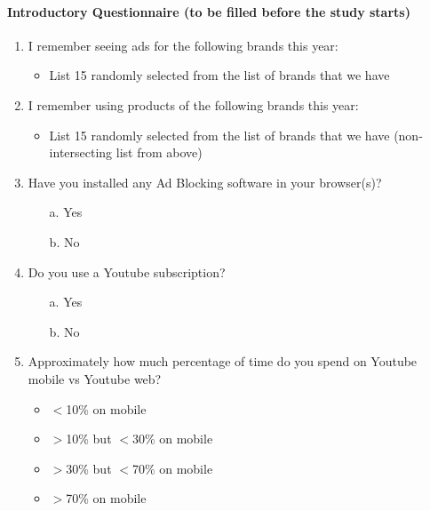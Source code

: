 \paragraph{Introductory Questionnaire (to be filled before the study starts)}

\begin{enumerate}
    \item I remember seeing ads for the following brands this year:
    \begin{itemize}
        \item List 15 randomly selected from the list of brands that we have
    \end{itemize}
    
    \item I remember using products of the following brands this year:
    \begin{itemize}
        \item List 15 randomly selected from the list of brands that we have (non-intersecting list from above)
    \end{itemize}
    
    \item Have you installed any Ad Blocking software in your browser(s)?
    \begin{itemize}
        \item[a.] Yes
        \item[b.] No
    \end{itemize}
    
    \item Do you use a Youtube subscription?
    \begin{itemize}
        \item[a.] Yes
        \item[b.] No
    \end{itemize}
    
    \item Approximately how much percentage of time do you spend on Youtube mobile vs Youtube web?
    \begin{itemize}
        \item $<$10\% on mobile
        \item $>$10\% but $<$30\% on mobile
        \item $>$30\% but $<$70\% on mobile
        \item $>$70\% on mobile
    \end{itemize}
    

\end{enumerate}
